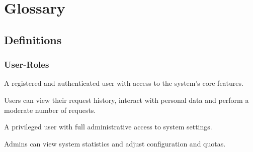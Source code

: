 \chapter{Glossary}

\section{Definitions}\label{sec:definitions}


\subsection{User-Roles}
\begin{description}[style=nextline, labelwidth=0pt, labelsep=0pt, leftmargin=0pt]
\setlength{\itemsep}{1em}
  \item[\textbf{\textit{User}}] \label{def:member}
    A registered and authenticated user with access to the system's core features.
    \item Users can view their request history, interact with personal data and perform a moderate number of requests.

  \item[\textbf{\textit{Admin}}] \label{def:admin}
    A privileged user with full administrative access to system settings.
    \item Admins can view system statistics and adjust configuration and quotas.

\end{description}

\newpage
